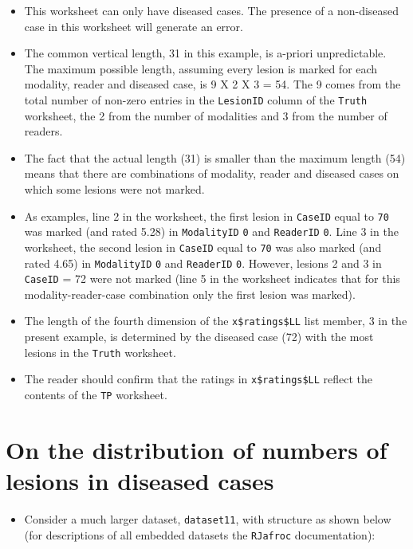 \documentclass[
]{book}
\providecommand{\tightlist}{%
  \setlength{\itemsep}{0pt}\setlength{\parskip}{0pt}}
\begin{document}
\begin{itemize}
\tightlist
\item
  This worksheet can only have diseased cases. The presence of a non-diseased case in this worksheet will generate an error.
\item
  The common vertical length, 31 in this example, is a-priori unpredictable. The maximum possible length, assuming every lesion is marked for each modality, reader and diseased case, is 9 X 2 X 3 = 54. The 9 comes from the total number of non-zero entries in the \texttt{LesionID} column of the \texttt{Truth} worksheet, the 2 from the number of modalities and 3 from the number of readers.
\item
  The fact that the actual length (31) is smaller than the maximum length (54) means that there are combinations of modality, reader and diseased cases on which some lesions were not marked.
\item
  As examples, line 2 in the worksheet, the first lesion in \texttt{CaseID} equal to \texttt{70} was marked (and rated 5.28) in \texttt{ModalityID} \texttt{0} and \texttt{ReaderID} \texttt{0}. Line 3 in the worksheet, the second lesion in \texttt{CaseID} equal to \texttt{70} was also marked (and rated 4.65) in \texttt{ModalityID} \texttt{0} and \texttt{ReaderID} \texttt{0}. However, lesions 2 and 3 in \texttt{CaseID} = 72 were not marked (line 5 in the worksheet indicates that for this modality-reader-case combination only the first lesion was marked).
\item
  The length of the fourth dimension of the \texttt{x\$ratings\$LL} list member, 3 in the present example, is determined by the diseased case (72) with the most lesions in the \texttt{Truth} worksheet.
\item
  The reader should confirm that the ratings in \texttt{x\$ratings\$LL} reflect the contents of the \texttt{TP} worksheet.
\end{itemize}

\hypertarget{quick-start-froc-data-distribution-diseased-cases}{%
\section{On the distribution of numbers of lesions in diseased cases}\label{quick-start-froc-data-distribution-diseased-cases}}

\begin{itemize}
\tightlist
\item
  Consider a much larger dataset, \texttt{dataset11}, with structure as shown below (for descriptions of all embedded datasets the \texttt{RJafroc} documentation):
\end{itemize}
\end{document}
